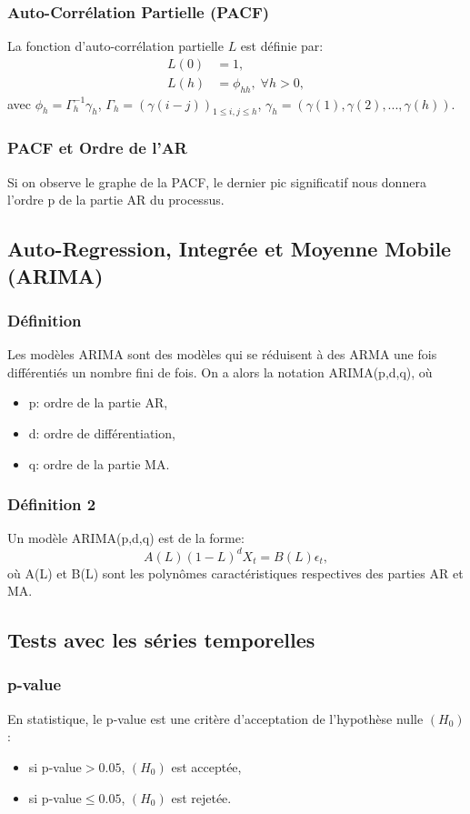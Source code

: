 \documentclass{article}
\begin{document}
\subsubsection{Auto-Corrélation Partielle (PACF)}
La fonction d'auto-corrélation partielle $L$ est définie par:
\begin{align*}
L(0)&=1,\\
L(h)&=\phi_{hh}, \; \forall h>0,
\end{align*}
avec $\phi_h={\Gamma^{-1}_h}{\gamma_h}$, $\Gamma_h=(\gamma(i-j))_{1\leq{i,j}\leq{h}}$, $\gamma_h=(\gamma(1),\gamma(2),...,\gamma(h))$.

\subsubsection{PACF et Ordre de l'AR}
Si on observe le graphe de la PACF, le dernier pic significatif nous donnera l'ordre p de la partie AR du processus.

\subsection{Auto-Regression, Integrée et Moyenne Mobile (ARIMA)}
\subsubsection{Définition}
Les modèles ARIMA sont des modèles qui se réduisent à des ARMA une fois différentiés un nombre fini de fois. On a alors la notation ARIMA(p,d,q), où 
\begin{itemize}
\item p: ordre de la partie AR,
\item d: ordre de différentiation,
\item q: ordre de la partie MA.
\end{itemize}

\subsubsection{Définition 2}
Un modèle ARIMA(p,d,q) est de la forme:
$$A(L)(1-L)^d{X_t}=B(L)\epsilon_t,$$
où A(L) et B(L) sont les polynômes caractéristiques respectives des parties AR et MA.

\subsection{Tests avec les séries temporelles}

\subsubsection{p-value}
En  statistique, le p-value est une critère d'acceptation de l'hypothèse nulle $(H_0)$:
\begin{itemize}
\item si p-value$>0.05$, $(H_0)$ est acceptée,
\item si p-value$\leq0.05$, $(H_0)$ est rejetée.
\end{itemize}
\end{document}
